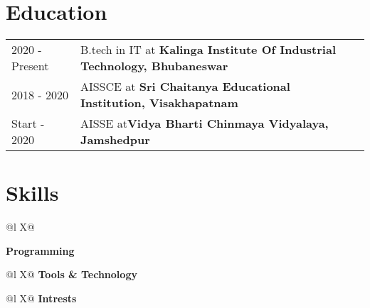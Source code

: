 \documentclass[a4paper,10pt]{article}
\begin{document}
\section{Education}
\begin{tabularx}{\linewidth}{@{}l X@{}}	
2020 - Present & B.tech in IT at \textbf{Kalinga Institute Of Industrial Technology, Bhubaneswar}  \\

2018 - 2020 & AISSCE at \textbf{Sri Chaitanya Educational Institution, Visakhapatnam}\\ 

Start - 2020 & AISSE at\textbf{Vidya Bharti Chinmaya Vidyalaya, Jamshedpur}  \\
\end{tabularx}



\section{Skills}
\begin{tabularx}{\linewidth}{@{}l X@{}}

\textbf{Programming}\\[3.75pt]
\end{tabularx}
\begin{tabularx}{\linewidth}{@{}l X@{}}
\textbf{Tools \& Technology}\\[3.75pt]
\end{tabularx}
\begin{tabularx}{\linewidth}{@{}l X@{}}
\textbf{Intrests}\\[3.75pt]
\end{tabularx}
\end{document}

